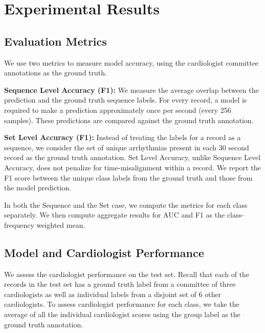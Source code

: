 \section{Experimental Results}

\subsection*{Evaluation Metrics}
We use two metrics to measure model accuracy, using the cardiologist committee
annotations as the ground truth.

\textbf{Sequence Level Accuracy (F1):} We measure the average overlap between
the prediction and the ground truth sequence labels. For every record, a model
is required to make a prediction approximately once per second (every 256
samples). These predictions are compared against the ground truth annotation.

\textbf{Set Level Accuracy (F1):} Instead of treating the labels for a record
as a sequence, we consider the set of unique arrhythmias present in each 30
second record as the ground truth annotation. Set Level Accuracy, unlike
Sequence Level Accuracy, does not penalize for time-misalignment within a
record. We report the F1 score between the unique class labels from the ground
truth and those from the model prediction.

In both the Sequence and the Set case, we compute the metrics for each class
separately. We then compute aggregate results for AUC and F1 as the
class-frequency weighted mean.

\subsection*{Model and Cardiologist Performance}

We assess the cardiologist performance on the test set. Recall that each of the
records in the test set has a ground truth label from a committee of three
cardiologists as well as individual labels from a disjoint set of 6 other
cardiologists. To assess cardiologist performance for each class, we take the
average of all the individual cardiologist scores using the group label as the
ground truth annotation.

